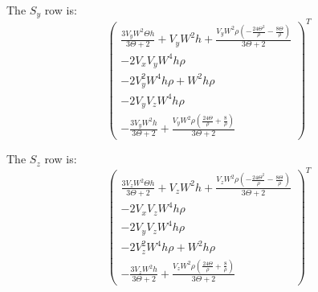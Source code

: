 \documentclass{article}
\begin{document}
The $S_y$ row is:
\begin{equation}
  \begin{pmatrix}\frac{3 V_{y} W^{2} \Theta h}{3 \Theta + 2} + V_{y} W^{2} h + \frac{V_{y} W^{2} \rho \left(- \frac{24 \Theta^{2}}{\rho} - \frac{8 \Theta}{\rho}\right)}{3 \Theta + 2} \\ - 2 V_{x} V_{y} W^{4} h \rho \\ - 2 V_{y}^{2} W^{4} h \rho + W^{2} h \rho \\ - 2 V_{y} V_{z} W^{4} h \rho \\ - \frac{3 V_{y} W^{2} h}{3 \Theta + 2} + \frac{V_{y} W^{2} \rho \left(\frac{24 \Theta}{\rho} + \frac{8}{\rho}\right)}{3 \Theta + 2}\end{pmatrix}^T
\end{equation}

The $S_z$ row is:
\begin{equation}
  \begin{pmatrix}\frac{3 V_{z} W^{2} \Theta h}{3 \Theta + 2} + V_{z} W^{2} h + \frac{V_{z} W^{2} \rho \left(- \frac{24 \Theta^{2}}{\rho} - \frac{8 \Theta}{\rho}\right)}{3 \Theta + 2} \\ - 2 V_{x} V_{z} W^{4} h \rho \\ - 2 V_{y} V_{z} W^{4} h \rho \\ - 2 V_{z}^{2} W^{4} h \rho + W^{2} h \rho \\ - \frac{3 V_{z} W^{2} h}{3 \Theta + 2} + \frac{V_{z} W^{2} \rho \left(\frac{24 \Theta}{\rho} + \frac{8}{\rho}\right)}{3 \Theta + 2}\end{pmatrix}^T
\end{equation}
\end{document}

